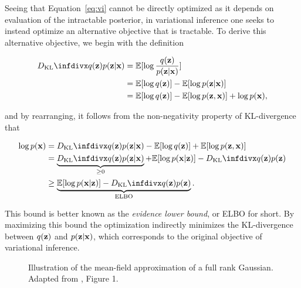 Seeing that Equation~\ref{eq:vi} cannot be directly optimized as it depends on evaluation of the intractable posterior, in variational inference one seeks to instead optimize an alternative objective that is tractable. To derive this alternative objective, we begin with the definition

\begin{equation}
\begin{aligned}
\dkl{q(\bz)}{p(\bz \vert \bx)} &= \mathbb{E}[\log \frac{q(\bz)}{p(\bz \vert \bx)}] \\
                               &= \mathbb{E}[\log q(\bz)] - \mathbb{E}[\log p(\bz \vert \bx)] \\
                               &= \mathbb{E}[\log q(\bz)] - \mathbb{E}[\log p(\bz, \bx)] + \log p(\bx),
\end{aligned}
\end{equation}

and by rearranging, it follows from the non-negativity property of KL-divergence that

\begin{equation}
\begin{aligned}
\log p(\bx) &= \dkl{q(\bz)}{p(\bz \vert \bx)} - \mathbb{E}[\log q(\bz)] + \mathbb{E}[\log p(\bz, \bx)] \\
            &= \underbrace{\dkl{q(\bz)}{p(\bz \vert \bx)}}_{\geq 0} + \mathbb{E}[\log p(\bx \vert \bz)] - \dkl{q(\bz)}{p(\bz)} \\
            &\geq \underbrace{\mathbb{E}[\log p(\bx \vert \bz)] - \dkl{q(\bz)}{p(\bz)}}_{\text{ELBO}}.
\end{aligned}
\end{equation}

This bound is better known as the \textit{evidence lower bound}, or ELBO for short. By maximizing this bound the optimization indirectly minimizes the KL-divergence between $q(\mathbf{z})$ and $p(\mathbf{z} \vert \mathbf{x})$, which corresponds to the original objective of variational inference.


\begin{figure}[!htb]
  \centering
  \resizebox{0.5\textwidth}{!}{\unskip}
  \caption{Illustration of the mean-field approximation of a full rank Gaussian. Adapted from \cite{variational_inference_review}, Figure 1.}
  \label{fig:mean_field_approximation}
\end{figure}

